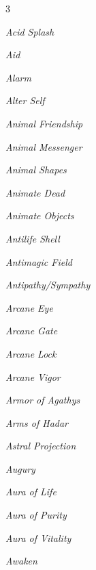\documentclass[10pt,a4paper,twoside,bg=print,twocolumn,openany,nodeprecatedcode]{dndbook}
\begin{document}
\begin{description}
\begin{multicols}{3}
\item \textit{Acid Splash}
\item \textit{Aid}
\item \textit{Alarm}
\item \textit{Alter Self}
\item \textit{Animal Friendship}
\item \textit{Animal Messenger}
\item \textit{Animal Shapes}
\item \textit{Animate Dead}
\item \textit{Animate Objects}
\item \textit{Antilife Shell}
\item \textit{Antimagic Field}
\item \textit{Antipathy/Sympathy}
\item \textit{Arcane Eye}
\item \textit{Arcane Gate}
\item \textit{Arcane Lock}
\item \textit{Arcane Vigor}
\item \textit{Armor of Agathys}
\item \textit{Arms of Hadar}
\item \textit{Astral Projection}
\item \textit{Augury}
\item \textit{Aura of Life}
\item \textit{Aura of Purity}
\item \textit{Aura of Vitality}
\item \textit{Awaken}
\end{multicols}

\end{description}
\end{document}
